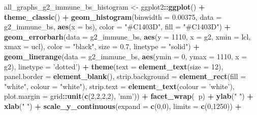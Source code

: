 \documentclass[]{article}
\newenvironment{Shaded}{\begin{snugshade}}{\end{snugshade}}
\newcommand{\KeywordTok}[1]{\textcolor[rgb]{0.13,0.29,0.53}{\textbf{#1}}}
\newcommand{\DataTypeTok}[1]{\textcolor[rgb]{0.13,0.29,0.53}{#1}}
\newcommand{\DecValTok}[1]{\textcolor[rgb]{0.00,0.00,0.81}{#1}}
\newcommand{\FloatTok}[1]{\textcolor[rgb]{0.00,0.00,0.81}{#1}}
\newcommand{\StringTok}[1]{\textcolor[rgb]{0.31,0.60,0.02}{#1}}
\newcommand{\OperatorTok}[1]{\textcolor[rgb]{0.81,0.36,0.00}{\textbf{#1}}}
\newcommand{\NormalTok}[1]{#1}
\begin{document}
\begin{Shaded}
\begin{Highlighting}[]
\NormalTok{all_graphs_g2_immune_bs_histogram <-}
\StringTok{  }\NormalTok{ggplot2}\OperatorTok{::}\KeywordTok{ggplot}\NormalTok{() }\OperatorTok{+}
\StringTok{  }\KeywordTok{theme_classic}\NormalTok{() }\OperatorTok{+}
\StringTok{  }\KeywordTok{geom_histogram}\NormalTok{(}\DataTypeTok{binwidth =} \FloatTok{0.00375}\NormalTok{, }\DataTypeTok{data =}\NormalTok{ g2_immune_bs, }\KeywordTok{aes}\NormalTok{(}\DataTypeTok{x =}\NormalTok{ bs),}
                 \DataTypeTok{color =} \StringTok{"#C1403D"}\NormalTok{,}
                 \DataTypeTok{fill =} \StringTok{"#C1403D"}\NormalTok{) }\OperatorTok{+}
\StringTok{  }\KeywordTok{geom_errorbarh}\NormalTok{(}\DataTypeTok{data =}\NormalTok{ g2_immune_bs,}
                 \KeywordTok{aes}\NormalTok{(}\DataTypeTok{y =} \DecValTok{1110}\NormalTok{, }\DataTypeTok{x =}\NormalTok{ g2, }\DataTypeTok{xmin =}\NormalTok{ lcl, }\DataTypeTok{xmax =}\NormalTok{ ucl),}
                 \DataTypeTok{color =} \StringTok{"black"}\NormalTok{, }\DataTypeTok{size =} \FloatTok{0.7}\NormalTok{, }\DataTypeTok{linetype =} \StringTok{"solid"}\NormalTok{) }\OperatorTok{+}
\StringTok{  }\KeywordTok{geom_linerange}\NormalTok{(}\DataTypeTok{data =}\NormalTok{ g2_immune_bs,  }\KeywordTok{aes}\NormalTok{(}\DataTypeTok{ymin =} \DecValTok{0}\NormalTok{, }\DataTypeTok{ymax =} \DecValTok{1110}\NormalTok{, }\DataTypeTok{x =}\NormalTok{ g2),}
                 \DataTypeTok{linetype =} \StringTok{'dotted'}\NormalTok{) }\OperatorTok{+}
\StringTok{  }\KeywordTok{theme}\NormalTok{(}\DataTypeTok{text =} \KeywordTok{element_text}\NormalTok{(}\DataTypeTok{size =} \DecValTok{12}\NormalTok{),}
        \DataTypeTok{panel.border =} \KeywordTok{element_blank}\NormalTok{(),}
        \DataTypeTok{strip.background =} \KeywordTok{element_rect}\NormalTok{(}\DataTypeTok{fill =} \StringTok{"white"}\NormalTok{, }\DataTypeTok{colour =} \StringTok{"white"}\NormalTok{),}
        \DataTypeTok{strip.text =} \KeywordTok{element_text}\NormalTok{(}\DataTypeTok{colour =} \StringTok{'white'}\NormalTok{),}
        \DataTypeTok{plot.margin =}\NormalTok{ grid}\OperatorTok{::}\KeywordTok{unit}\NormalTok{(}\KeywordTok{c}\NormalTok{(}\DecValTok{2}\NormalTok{,}\DecValTok{2}\NormalTok{,}\DecValTok{2}\NormalTok{,}\DecValTok{2}\NormalTok{), }\StringTok{'mm'}\NormalTok{)) }\OperatorTok{+}
\StringTok{  }\KeywordTok{facet_wrap}\NormalTok{(}\OperatorTok{~}\NormalTok{p) }\OperatorTok{+}
\StringTok{  }\KeywordTok{ylab}\NormalTok{(}\StringTok{" "}\NormalTok{) }\OperatorTok{+}
\StringTok{  }\KeywordTok{xlab}\NormalTok{(}\StringTok{" "}\NormalTok{) }\OperatorTok{+}
\StringTok{  }\KeywordTok{scale_y_continuous}\NormalTok{(}\DataTypeTok{expand =} \KeywordTok{c}\NormalTok{(}\DecValTok{0}\NormalTok{,}\DecValTok{0}\NormalTok{), }\DataTypeTok{limits =} \KeywordTok{c}\NormalTok{(}\DecValTok{0}\NormalTok{,}\DecValTok{1250}\NormalTok{)) }\OperatorTok{+}

\end{Highlighting}
\end{Shaded}
\end{document}
